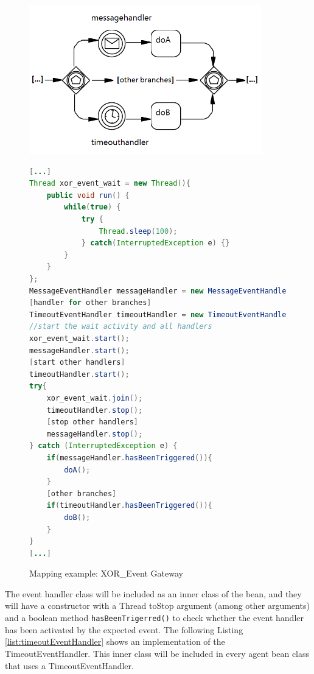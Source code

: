 \begin{figure}[h]
\begin{minipage}[c]{0.5\textwidth}
\includegraphics[width=0.9\textwidth]{images/mapping/xor-event.png}
\end{minipage}
\begin{minipage}[c]{0.5\textwidth}
\begin{lstlisting}[language=Java]
[...]
Thread xor_event_wait = new Thread(){
	public void run() {
		while(true) {
			try {
				Thread.sleep(100);
			} catch(InterruptedException e) {}
		}
	}
};
MessageEventHandler messageHandler = new MessageEventHandler(xor_event_wait);
[handler for other branches]
TimeoutEventHandler timeoutHandler = new TimeoutEventHandler(20000, xor_event_wait);
//start the wait activity and all handlers
xor_event_wait.start();
messageHandler.start();
[start other handlers]
timeoutHandler.start();
try{
	xor_event_wait.join();
	timeoutHandler.stop();
	[stop other handlers]
	messageHandler.stop();
} catch (InterruptedException e) {
	if(messageHandler.hasBeenTriggered()){
		doA();
	}
	[other branches]
	if(timeoutHandler.hasBeenTriggered()){
		doB();
	}
}
[...]
\end{lstlisting}
\end{minipage}
\caption{Mapping example: XOR\_Event Gateway}%
\label{fig:mapping_xorEvent}%
\end{figure}
\newpage
The event handler class will be included as an inner class of the bean, and they will have a constructor with a Thread toStop argument (among other arguments) and a boolean method \verb|hasBeenTrigerred()| to check whether the event handler has been activated by the expected event. The following Listing \ref{list:timeoutEventHandler} shows an implementation of the TimeoutEventHandler. This inner class will be included in every agent bean class that uses a TimeoutEventHandler.\\\\

